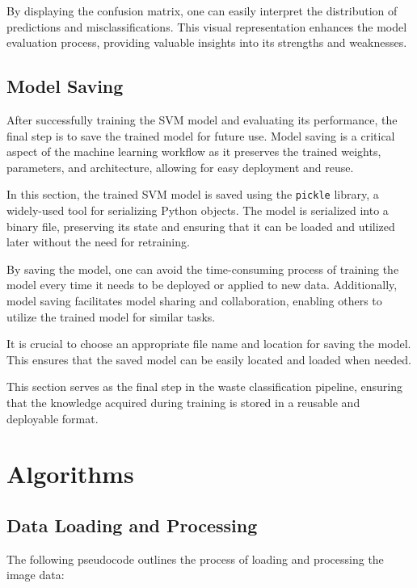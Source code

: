 \documentclass{article}
\begin{document}
By displaying the confusion matrix, one can easily interpret the distribution of predictions and misclassifications. This visual representation enhances the model evaluation process, providing valuable insights into its strengths and weaknesses.

\subsection{Model Saving}
After successfully training the SVM model and evaluating its performance, the final step is to save the trained model for future use. Model saving is a critical aspect of the machine learning workflow as it preserves the trained weights, parameters, and architecture, allowing for easy deployment and reuse.

In this section, the trained SVM model is saved using the \texttt{pickle} library, a widely-used tool for serializing Python objects. The model is serialized into a binary file, preserving its state and ensuring that it can be loaded and utilized later without the need for retraining.

By saving the model, one can avoid the time-consuming process of training the model every time it needs to be deployed or applied to new data. Additionally, model saving facilitates model sharing and collaboration, enabling others to utilize the trained model for similar tasks.

It is crucial to choose an appropriate file name and location for saving the model. This ensures that the saved model can be easily located and loaded when needed.

This section serves as the final step in the waste classification pipeline, ensuring that the knowledge acquired during training is stored in a reusable and deployable format.

\section{Algorithms}

\subsection{Data Loading and Processing}
The following pseudocode outlines the process of loading and processing the image data:
\end{document}
